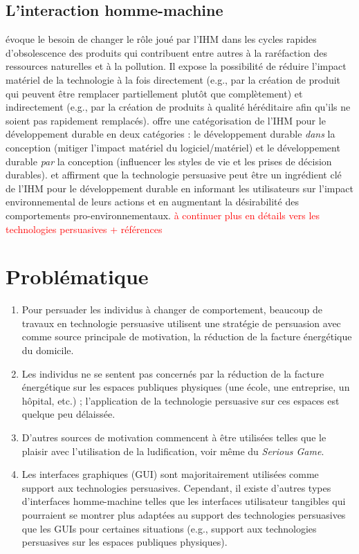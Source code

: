 \documentclass[10pt,a5paper,twoside]{article}
\begin{document}
\subsection{L'interaction
homme-machine}\label{linteraction-homme-machine}

\citet{Blevis2007sustainable} évoque le besoin de changer le rôle joué
par l'IHM dans les cycles rapides d'obsolescence des produits qui
contribuent entre autres à la raréfaction des ressources naturelles et à
la pollution. Il expose la possibilité de réduire l'impact matériel de
la technologie à la fois directement (e.g., par la création de produit
qui peuvent être remplacer partiellement plutôt que complètement) et
indirectement (e.g., par la création de produits à qualité héréditaire
afin qu'ils ne soient pas rapidement remplacés).
\citet{mankoff2007environmental} offre une catégorisation de l'IHM pour
le développement durable en deux catégories : le développement durable
\emph{dans} la conception (mitiger l'impact matériel du
logiciel/matériel) et le développement durable \emph{par} la conception
(influencer les styles de vie et les prises de décision durables).
\citet{Reitberger2008surrounded} et \citet{Tscheligi2007persuasion}
affirment que la technologie persuasive peut être un ingrédient clé de
l'IHM pour le développement durable en informant les utilisateurs sur
l'impact environnemental de leurs actions et en augmentant la
désirabilité des comportements pro-environnementaux.
\textcolor{red}{à continuer plus en détails vers les technologies persuasives + références}

\section{Problématique}\label{probluxe9matique}

\begin{enumerate}
\def\labelenumi{\arabic{enumi}.}
\itemsep1pt\parskip0pt
\item
  Pour persuader les individus à changer de comportement, beaucoup de
  travaux en technologie persuasive utilisent une stratégie de
  persuasion avec comme source principale de motivation, la réduction de
  la facture énergétique du domicile.
\item
  Les individus ne se sentent pas concernés par la réduction de la
  facture énergétique sur les espaces publiques physiques (une école,
  une entreprise, un hôpital, etc.) ; l'application de la technologie
  persuasive sur ces espaces est quelque peu délaissée.
\item
  D'autres sources de motivation commencent à être utilisées telles que
  le plaisir avec l'utilisation de la ludification, voir même du
  \emph{Serious Game}.
\item
  Les interfaces graphiques (GUI) sont majoritairement utilisées comme
  support aux technologies persuasives. Cependant, il existe d'autres
  types d'interfaces homme-machine telles que les interfaces utilisateur
  tangibles qui pourraient se montrer plus adaptées au support des
  technologies persuasives que les GUIs pour certaines situations (e.g.,
  support aux technologies persuasives sur les espaces publiques
  physiques).
\end{enumerate}
\end{document}
